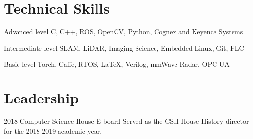 \documentclass{tccv}
\begin{document}
\section{Technical Skills}
\begin{factlist}

\item{Advanced  level}
     {C, C++, ROS, OpenCV, Python, Cognex and Keyence Systems}

\item{Intermediate level}
     {SLAM, LiDAR, Imaging Science, Embedded Linux, Git, PLC}

\item{Basic level}
     {Torch, Caffe, RTOS, \LaTeX, Verilog, mmWave Radar, OPC UA}

\end{factlist}

\section{Leadership}
\begin{yearlist}

\item{2018}
     {Computer Science House E-board}
     {Served as the CSH House History director for the 2018-2019 academic year.}

\end{yearlist}
\end{document}

